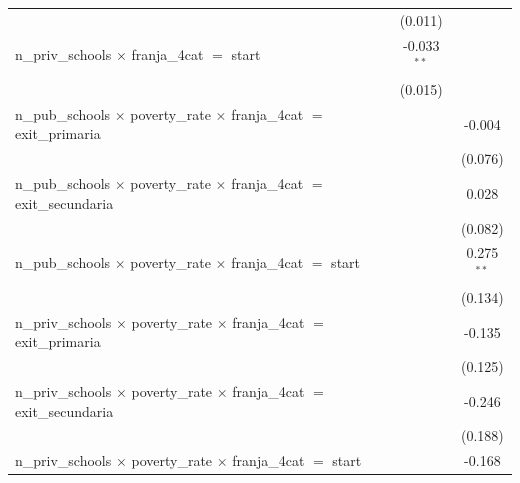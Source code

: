 \begin{tabular}{lccc}
                                                                                               &                & (0.011)               &   \\   
   n\_priv\_schools $\times$ franja\_4cat $=$ start                                            &                & -0.033$^{**}$         &   \\   
                                                                                               &                & (0.015)               &   \\   
   n\_pub\_schools  $\times$  poverty\_rate $\times$ franja\_4cat $=$ exit\_primaria           &                &                       & -0.004\\   
                                                                                               &                &                       & (0.076)\\   
   n\_pub\_schools  $\times$  poverty\_rate $\times$ franja\_4cat $=$ exit\_secundaria         &                &                       & 0.028\\   
                                                                                               &                &                       & (0.082)\\   
   n\_pub\_schools  $\times$  poverty\_rate $\times$ franja\_4cat $=$ start                    &                &                       & 0.275$^{**}$\\   
                                                                                               &                &                       & (0.134)\\   
   n\_priv\_schools  $\times$  poverty\_rate $\times$ franja\_4cat $=$ exit\_primaria          &                &                       & -0.135\\   
                                                                                               &                &                       & (0.125)\\   
   n\_priv\_schools  $\times$  poverty\_rate $\times$ franja\_4cat $=$ exit\_secundaria        &                &                       & -0.246\\   
                                                                                               &                &                       & (0.188)\\   
   n\_priv\_schools  $\times$  poverty\_rate $\times$ franja\_4cat $=$ start                   &                &                       & -0.168\\   

\end{tabular}
